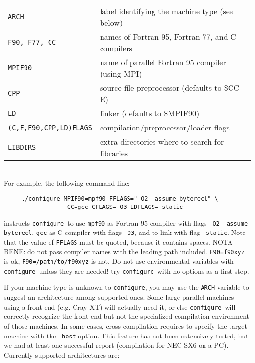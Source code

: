 \documentclass[12pt,a4paper]{article}
\def\configure{\texttt{configure}}
\begin{document}
\begin{tabular}{ll}
\texttt{ARCH}& label identifying the machine type (see below)\\
\texttt{F90, F77, CC} &names of Fortran 95, Fortran 77, and C compilers\\
\texttt{MPIF90} &       name of parallel Fortran 95 compiler (using MPI)\\
\texttt{CPP} &          source file preprocessor (defaults to \$CC -E)\\
\texttt{LD} &           linker (defaults to \$MPIF90)\\
\texttt{(C,F,F90,CPP,LD)FLAGS}& compilation/preprocessor/loader flags\\
\texttt{LIBDIRS}&     extra directories where to search for libraries\\
\end{tabular}\\
For example, the following command line:
\begin{verbatim}
     ./configure MPIF90=mpf90 FFLAGS="-O2 -assume byterecl" \
                  CC=gcc CFLAGS=-O3 LDFLAGS=-static
\end{verbatim}
instructs \configure\ to use \texttt{mpf90} as Fortran 95 compiler 
with flags \texttt{-O2 -assume byterecl}, \texttt{gcc} as C compiler with 
flags \texttt{-O3}, and to link with flag \texttt{-static}. 
Note that the value of \texttt{FFLAGS} must be quoted, because it contains
spaces. NOTA BENE: do not pass compiler names with the leading path
included. \texttt{F90=f90xyz} is ok, \texttt{F90=/path/to/f90xyz} is not. 
Do not use
environmental variables with \configure\ unless they are needed! try
\configure\ with no options as a first step.

If your machine type is unknown to \configure, you may use the 
\texttt{ARCH}
variable to suggest an architecture among supported ones. Some large
parallel machines using a front-end (e.g. Cray XT) will actually
need it, or else \configure\ will correctly recognize the front-end
but not the specialized compilation environment of those
machines. In some cases, cross-compilation requires to specify the target machine with the
\texttt{--host} option. This feature has not been extensively
tested, but we had at least one successful report (compilation 
for NEC SX6 on a PC). Currently supported architectures are:
\end{document}

